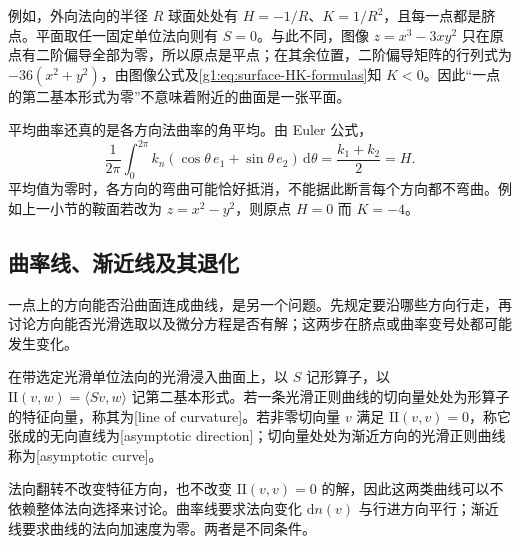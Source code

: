 例如，外向法向的半径 \(R\) 球面处处有 \(H=-1/R\)、\(K=1/R^2\)，且每一点都是脐点。平面取任一固定单位法向则有 \(S=0\)。与此不同，图像 \(z=x^3-3xy^2\) 只在原点有二阶偏导全部为零，所以原点是平点；在其余位置，二阶偏导矩阵的行列式为 \(-36(x^2+y^2)\)，由图像公式及\eqref{g1:eq:surface-HK-formulas}知 \(K<0\)。因此“一点的第二基本形式为零”不意味着附近的曲面是一张平面。

\ProseParagraphBreak

平均曲率还真的是各方向法曲率的角平均。由 Euler 公式，
\[
	\frac1{2\pi}\int_0^{2\pi}k_n(\cos\theta\,e_1+\sin\theta\,e_2)\,\mathrm d\theta
	=\frac{k_1+k_2}2=H.
\]
平均值为零时，各方向的弯曲可能恰好抵消，不能据此断言每个方向都不弯曲。例如上一小节的鞍面若改为 \(z=x^2-y^2\)，则原点 \(H=0\) 而 \(K=-4\)。

\subsection{曲率线、渐近线及其退化}
\label{g1:subsec:0802:04}

一点上的方向能否沿曲面连成曲线，是另一个问题。先规定要沿哪些方向行走，再讨论方向能否光滑选取以及微分方程是否有解；这两步在脐点或曲率变号处都可能发生变化。

\begin{definition}\label{g1:def:principal-asymptotic-curves}
	在带选定光滑单位法向的光滑浸入曲面上，以 \(S\) 记形算子，以 \(\mathrm{II}(v,w)=\langle Sv,w\rangle\) 记第二基本形式。若一条光滑正则曲线的切向量处处为形算子的特征向量，称其为[line of curvature]。若非零切向量 \(v\) 满足 \(\mathrm{II}(v,v)=0\)，称它张成的无向直线为[asymptotic direction]；切向量处处为渐近方向的光滑正则曲线称为[asymptotic curve]。
\end{definition}

法向翻转不改变特征方向，也不改变 \(\mathrm{II}(v,v)=0\) 的解，因此这两类曲线可以不依赖整体法向选择来讨论。曲率线要求法向变化 \(\mathrm dn(v)\) 与行进方向平行；渐近线要求曲线的法向加速度为零。两者是不同条件。

